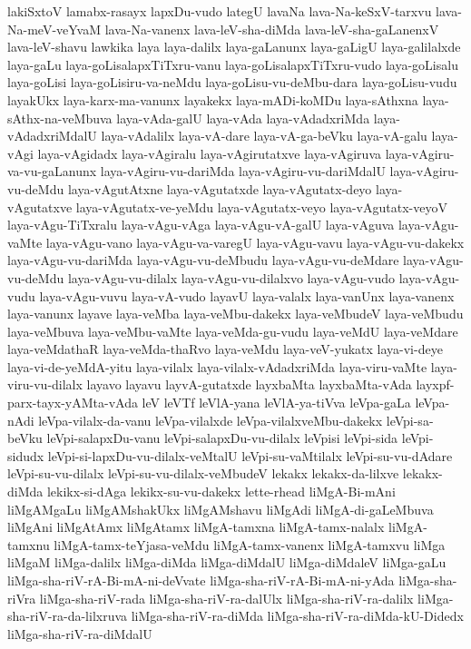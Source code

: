 {lakiSxtoV
lamabx-rasayx
lapxDu-vudo
lategU
lavaNa
lava-Na-keSxV-tarxvu
lava-Na-meV-veYvaM
lava-Na-vanenx
lava-leV-sha-diMda
lava-leV-sha-gaLanenxV
lava-leV-shavu
lawkika
laya
laya-dalilx
laya-gaLanunx
laya-gaLigU
laya-galilalxde
laya-gaLu
laya-goLisalapxTiTxru-vanu
laya-goLisalapxTiTxru-vudo
laya-goLisalu
laya-goLisi
laya-goLisiru-va-neMdu
laya-goLisu-vu-deMbu-dara
laya-goLisu-vudu
layakUkx
laya-karx-ma-vanunx
layakekx
laya-mADi-koMDu
laya-sAthxna
laya-sAthx-na-veMbuva
laya-vAda-galU
laya-vAda
laya-vAdadxriMda
laya-vAdadxriMdalU
laya-vAdalilx
laya-vA-dare
laya-vA-ga-beVku
laya-vA-galu
laya-vAgi
laya-vAgidadx
laya-vAgiralu
laya-vAgirutatxve
laya-vAgiruva
laya-vAgiru-va-vu-gaLanunx
laya-vAgiru-vu-dariMda
laya-vAgiru-vu-dariMdalU
laya-vAgiru-vu-deMdu
laya-vAgutAtxne
laya-vAgutatxde
laya-vAgutatx-deyo
laya-vAgutatxve
laya-vAgutatx-ve-yeMdu
laya-vAgutatx-veyo
laya-vAgutatx-veyoV
laya-vAgu-TiTxralu
laya-vAgu-vAga
laya-vAgu-vA-galU
laya-vAguva
laya-vAgu-vaMte
laya-vAgu-vano
laya-vAgu-va-varegU
laya-vAgu-vavu
laya-vAgu-vu-dakekx
laya-vAgu-vu-dariMda
laya-vAgu-vu-deMbudu
laya-vAgu-vu-deMdare
laya-vAgu-vu-deMdu
laya-vAgu-vu-dilalx
laya-vAgu-vu-dilalxvo
laya-vAgu-vudo
laya-vAgu-vudu
laya-vAgu-vuvu
laya-vA-vudo
layavU
laya-valalx
laya-vanUnx
laya-vanenx
laya-vanunx
layave
laya-veMba
laya-veMbu-dakekx
laya-veMbudeV
laya-veMbudu
laya-veMbuva
laya-veMbu-vaMte
laya-veMda-gu-vudu
laya-veMdU
laya-veMdare
laya-veMdathaR
laya-veMda-thaRvo
laya-veMdu
laya-veV-yukatx
laya-vi-deye
laya-vi-de-yeMdA-yitu
laya-vilalx
laya-vilalx-vAdadxriMda
laya-viru-vaMte
laya-viru-vu-dilalx
layavo
layavu
layvA-gutatxde
layxbaMta
layxbaMta-vAda
layxpf-parx-tayx-yAMta-vAda
leV
leVTf
leVlA-yana
leVlA-ya-tiVva
leVpa-gaLa
leVpa-nAdi
leVpa-vilalx-da-vanu
leVpa-vilalxde
leVpa-vilalxveMbu-dakekx
leVpi-sa-beVku
leVpi-salapxDu-vanu
leVpi-salapxDu-vu-dilalx
leVpisi
leVpi-sida
leVpi-sidudx
leVpi-si-lapxDu-vu-dilalx-veMtalU
leVpi-su-vaMtilalx
leVpi-su-vu-dAdare
leVpi-su-vu-dilalx
leVpi-su-vu-dilalx-veMbudeV
lekakx
lekakx-da-lilxve
lekakx-diMda
lekikx-si-dAga
lekikx-su-vu-dakekx
lette-rhead
liMgA-Bi-mAni
liMgAMgaLu
liMgAMshakUkx
liMgAMshavu
liMgAdi
liMgA-di-gaLeMbuva
liMgAni
liMgAtAmx
liMgAtamx
liMgA-tamxna
liMgA-tamx-nalalx
liMgA-tamxnu
liMgA-tamx-teYjasa-veMdu
liMgA-tamx-vanenx
liMgA-tamxvu
liMga
liMgaM
liMga-dalilx
liMga-diMda
liMga-diMdalU
liMga-diMdaleV
liMga-gaLu
liMga-sha-riV-rA-Bi-mA-ni-deVvate
liMga-sha-riV-rA-Bi-mA-ni-yAda
liMga-sha-riVra
liMga-sha-riV-rada
liMga-sha-riV-ra-dalUlx
liMga-sha-riV-ra-dalilx
liMga-sha-riV-ra-da-lilxruva
liMga-sha-riV-ra-diMda
liMga-sha-riV-ra-diMda-kU-Didedx
liMga-sha-riV-ra-diMdalU
}
